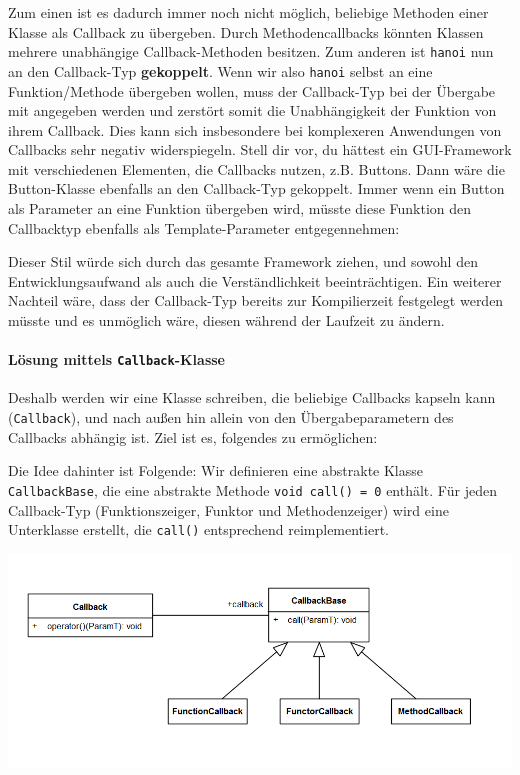 Zum einen ist es dadurch immer noch nicht möglich, beliebige Methoden einer Klasse als Callback zu übergeben.
Durch Methodencallbacks könnten Klassen mehrere unabhängige Callback-Methoden besitzen.
Zum anderen ist \lstinline{hanoi} nun an den Callback-Typ \textbf{gekoppelt}.
Wenn wir also \lstinline{hanoi} selbst an eine Funktion/Methode übergeben wollen, muss der Callback-Typ bei der Übergabe mit angegeben werden und zerstört somit die Unabhängigkeit der Funktion von ihrem Callback.
Dies kann sich insbesondere bei komplexeren Anwendungen von Callbacks sehr negativ widerspiegeln.
Stell dir vor, du hättest ein GUI-Framework mit verschiedenen Elementen, die Callbacks nutzen, z.B. Buttons.
Dann wäre die Button-Klasse ebenfalls an den Callback-Typ gekoppelt.
Immer wenn ein Button als Parameter an eine Funktion übergeben wird, müsste diese Funktion den Callbacktyp ebenfalls als Template-Parameter entgegennehmen:


Dieser Stil würde sich durch das gesamte Framework ziehen, und sowohl den Entwicklungsaufwand als auch die Verständlichkeit beeinträchtigen.
Ein weiterer Nachteil wäre, dass der Callback-Typ bereits zur Kompilierzeit festgelegt werden müsste und es unmöglich wäre, diesen während der Laufzeit zu ändern.

\paragraph*{Lösung mittels \lstinline{Callback}-Klasse}

Deshalb werden wir eine Klasse schreiben, die beliebige Callbacks kapseln kann (\lstinline{Callback}), und nach außen hin allein von den Übergabeparametern des Callbacks abhängig ist.
Ziel ist es, folgendes zu ermöglichen:


Die Idee dahinter ist Folgende:
Wir definieren eine abstrakte Klasse \lstinline{CallbackBase}, die eine abstrakte Methode \lstinline{void call() = 0} enthält.
Für jeden Callback-Typ (Funktionszeiger, Funktor und Methodenzeiger) wird eine Unterklasse erstellt, die \lstinline{call()} entsprechend reimplementiert.

\begin{center}
\includegraphics[width=.7\textwidth]{04_advanced/figures/callback_metamodel.png}
\end{center}

